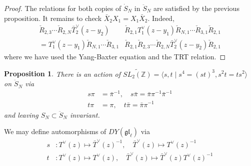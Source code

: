 \documentclass[11pt]{report}
\newtheorem{prop}[theorem]{Proposition}
\theoremstyle{definition}
\theoremstyle{remark}
\newtheorem*{remark}{Remark}
\theoremstyle{remark}
\newcommand{\Z}{\mathbb{Z}}
\newcommand{\C}{\mathbb{C}}
\begin{document}
\begin{proof}
The relations for both copies of $\dot S_N$ in $\ddot S_N$ are satisfied by the previous proposition. It remains to check $\bar X_2 X_1 = X_1 \bar X_2$. Indeed,
\begin{align*}
\check R_{2,3} \cdots \check R_{2,N} \bar T_2^\vee(z-y_2) &\check R_{2,1} T_1^\vee(z-y_1) \check R_{N,1} \cdots \check R_{3,1} \check R_{2,1} \\
= T_1^\vee(z-y_1) \check R_{N,1} \cdots \check R_{3,1} &\check R_{2,1} \check R_{2,3} \cdots \check R_{2,N} \bar T_2^\vee(z-y_2) \check R_{2,1}
\end{align*}
where we have used the Yang-Baxter equation and the TRT relation.
\end{proof}


\begin{prop}
There is an action of $\widetilde{SL_2(\Z)} = \langle s,t \mid s^4 = (st)^3, s^2 t = t s^2 \rangle$ on $\ddot S_N$ via
\begin{align*}
s \pi &= \bar \pi^{-1}, \quad s \bar \pi = \bar \pi \pi^{-1} \bar \pi^{-1} \\
t \pi &= \pi, \quad t \bar \pi = \bar \pi \pi^{-1}
\end{align*}
and leaving $S_N \subset \ddot S_N$ invariant.
\end{prop}

We may define automorphisms of $DY(\mathfrak{gl}_\ell)$ via
\begin{align*}
s &: T^\vee(z) \mapsto \bar T^\vee(z)^{-1}, \quad \bar T^\vee(z) \mapsto T^\vee(z)^{-1} \\
t &: T^\vee(z) \mapsto T^\vee(z), \quad \bar T^\vee(z) \mapsto \bar T^\vee(z) T^\vee(z)^{-1}
\end{align*}
\end{document}
